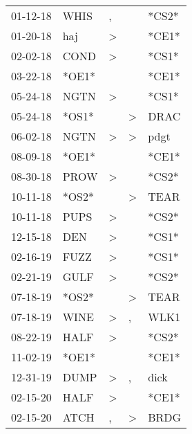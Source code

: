 \begin{supertabular}{lllll}
 01-12-18 &   WHIS &                , &                  &  *CS2* \\
 01-20-18 &    haj &     \textgreater &                  &  *CE1* \\
 02-02-18 &   COND &     \textgreater &                  &  *CS1* \\
 03-22-18 &  *OE1* &                  &                  &  *CE1* \\
 05-24-18 &   NGTN &     \textgreater &                  &  *CS1* \\
 05-24-18 &  *OS1* &                  &     \textgreater &   DRAC \\
 06-02-18 &   NGTN &     \textgreater &     \textgreater &   pdgt \\
 08-09-18 &  *OE1* &                  &                  &  *CE1* \\
 08-30-18 &   PROW &     \textgreater &                  &  *CS2* \\
 10-11-18 &  *OS2* &                  &     \textgreater &   TEAR \\
 10-11-18 &   PUPS &     \textgreater &                  &  *CS2* \\
 12-15-18 &    DEN &     \textgreater &                  &  *CS1* \\
 02-16-19 &   FUZZ &     \textgreater &                  &  *CS1* \\
 02-21-19 &   GULF &     \textgreater &                  &  *CS2* \\
 07-18-19 &  *OS2* &                  &     \textgreater &   TEAR \\
 07-18-19 &   WINE &     \textgreater &                , &   WLK1 \\
 08-22-19 &   HALF &     \textgreater &                  &  *CS2* \\
 11-02-19 &  *OE1* &                  &                  &  *CE1* \\
 12-31-19 &   DUMP &     \textgreater &                , &   dick \\
 02-15-20 &   HALF &     \textgreater &                  &  *CE1* \\
 02-15-20 &   ATCH &                , &     \textgreater &   BRDG \\
\end{supertabular}
